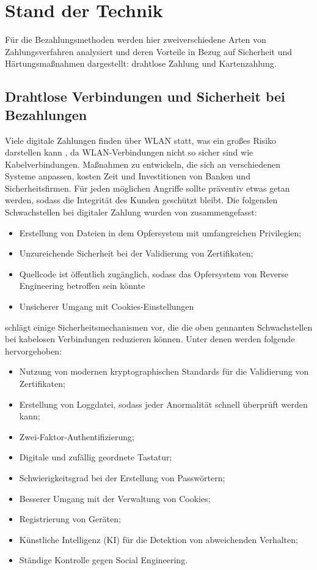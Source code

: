 \section{Stand der Technik}

Für die Bezahlungsmethoden werden hier zweiverschiedene Arten von Zahlungsverfahren analysiert und deren
Vorteile in Bezug auf Sicherheit und Härtungsmaßnahmen dargestellt: drahtlose Zahlung und Kartenzahlung.

\subsection{Drahtlose Verbindungen und Sicherheit bei Bezahlungen}

Viele digitale Zahlungen finden über WLAN statt, was ein großes Risiko darstellen kann \cite{refip:NYRS}, 
da WLAN-Verbindungen nicht so sicher sind wie Kabelverbindungen. Maßnahmen zu entwickeln, die sich an 
verschiedenen Systeme anpassen, kosten Zeit und Investitionen von Banken und Sicherheitsfirmen. 
Für jeden möglichen Angriffe sollte präventiv etwas getan werden, sodass die Integrität des Kunden 
geschützt bleibt. Die folgenden Schwachstellen bei digitaler Zahlung wurden von \cite{refip:NYRS}
zusammengefasst:

\begin{itemize}
    \item Erstellung von Dateien in dem Opfersystem mit umfangreichen Privilegien;
    \item Unzureichende Sicherheit bei der Validierung von Zertifikaten;
    \item Quellcode ist öffentlich zugänglich, sodass das Opfersystem von Reverse
    Engineering betroffen sein könnte
    \item Unsicherer Umgang mit Cookies-Einstellungen
\end{itemize}

\cite{refip:NYRS} schlägt einige Sicherheitsmechanismen vor, die die oben gennanten Schwachstellen bei 
kabelosen Verbindungen reduzieren können. Unter denen werden folgende hervorgehoben: 

\begin{itemize}
    \item Nutzung von modernen kryptographischen Standards für die Validierung von Zertifikaten;
    \item Erstellung von Loggdatei, sodass jeder Anormalität schnell überprüft werden kann;
    \item Zwei-Faktor-Authentifizierung;
    \item Digitale und zufällig geordnete Tastatur;
    \item Schwierigkeitsgrad bei der Erstellung von Passwörtern;
    \item Besserer Umgang mit der Verwaltung von Cookies;
    \item Registrierung von Geräten;
    \item Künstliche Intelligenz (KI) für die Detektion von abweichenden Verhalten;
    \item Ständige Kontrolle gegen Social Engineering.
\end{itemize}


